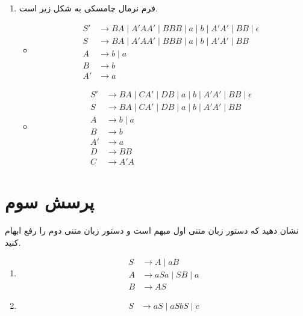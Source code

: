 \begin{enumerate}
	\item {فرم نرمال چامسکی به شکل زیر است.}
	\begin{itemize}
		\item
		\begin{align*}
			S' & \rightarrow BA \mid A'AA' \mid BBB \mid a \mid b \mid A'A' \mid BB \mid \epsilon \\
			S & \rightarrow BA \mid A'AA' \mid BBB \mid a \mid b \mid A'A' \mid BB \\
			A & \rightarrow b \mid a \\
			B & \rightarrow b \\
			A' & \rightarrow a
		\end{align*}
		
		\item
		\begin{align*}
			S' & \rightarrow BA \mid CA' \mid DB \mid a \mid b \mid A'A' \mid BB \mid \epsilon \\
			S & \rightarrow BA \mid CA' \mid DB \mid a \mid b \mid A'A' \mid BB \\
			A & \rightarrow b \mid a \\
			B & \rightarrow b \\
			A' & \rightarrow a \\
			D & \rightarrow BB \\
			C & \rightarrow A'A
		\end{align*}
		
	\end{itemize}
\end{enumerate}

\section*{پرسش سوم}


نشان دهید که دستور زبان‌ متنی اول مبهم است و دستور زبان متنی دوم را رفع ابهام کنید. 
\begin{enumerate}
	\item {}\[
	\begin{aligned}
		S &\rightarrow A \mid aB \\
		A &\rightarrow aSa \mid SB \mid a \\
		B &\rightarrow AS
	\end{aligned}
	\]
	
	
	\item {} \[
	\begin{aligned}
		S &\rightarrow aS \mid aSbS \mid c
	\end{aligned}
	\]
\end{enumerate}



